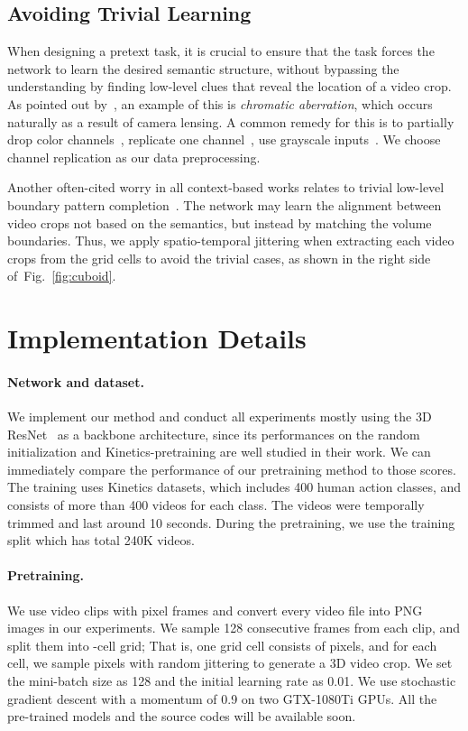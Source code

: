 \documentclass[letterpaper]{article} \usepackage{aaai19}  \usepackage{times}  \usepackage{helvet}  \usepackage{courier}  \usepackage{url}  \usepackage{graphicx}  \frenchspacing  \setlength{\pdfpagewidth}{8.5in}  \setlength{\pdfpageheight}{11in}
\newcommand{\figref}[1]{Fig.~\ref{#1}}
\begin{document}
\subsection{Avoiding Trivial Learning}
When designing a pretext task, it is crucial to ensure that the task forces the network to learn the desired semantic structure, without bypassing the understanding by finding low-level clues that reveal the location of a video crop. As pointed out by~\cite{doersch2015unsupervised}, an example of this is \textit{chromatic aberration}, which occurs naturally as a result of camera lensing. A common remedy for this is to partially drop color channels~\cite{doersch2015unsupervised}, replicate one channel~\cite{lee2017unsupervised}, use grayscale inputs~\cite{noroozi2016unsupervised}. We choose channel replication as our data preprocessing.  




Another often-cited worry in all context-based works relates to trivial low-level boundary pattern completion~\cite{doersch2015unsupervised,noroozi2016unsupervised,lee2017unsupervised}. The network may learn the alignment between video crops not based on the semantics, but instead by matching the volume boundaries. Thus, we apply spatio-temporal jittering when extracting each video crops from the grid cells to avoid the trivial cases, as shown in the right side of~\figref{fig:cuboid}.



\section{Implementation Details}
\paragraph{Network and dataset.} \quad We implement our method and conduct all experiments mostly using the 3D ResNet~\cite{hara2018can} as a backbone architecture, since its performances on the random initialization and Kinetics-pretraining are well studied in their work. We can immediately compare the performance of our pretraining method to those scores. The training uses Kinetics datasets, which includes 400 human action classes, and consists of more than 400 videos for each class. The videos were temporally trimmed and last around 10 seconds. During the pretraining, we use the training split which has total 240K videos.

\noindent \paragraph{Pretraining.}  \quad We use video clips with  pixel frames and convert every video file into PNG images in our experiments. We sample 128 consecutive frames from each clip, and split them into -cell grid; That is, one grid cell consists of  pixels, and for each cell, we sample  pixels with random jittering to generate a 3D video crop. We set the mini-batch size as 128 and the initial learning rate as 0.01. We use stochastic gradient descent with a momentum of 0.9 on two GTX-1080Ti GPUs. All the pre-trained models and the source codes will be available soon.
\end{document}
